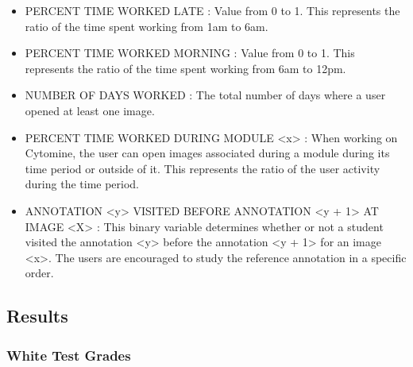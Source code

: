 \documentclass[a4paper,11pt]{report}
\numberwithin{figure}{section} %
\begin{document}
\begin{itemize}
    \item[\textbullet] PERCENT TIME WORKED LATE : Value from 0 to 1.
    This represents the ratio of the time spent working from 1am to 6am.
        
    \item[\textbullet] PERCENT TIME WORKED MORNING : Value from 0 to 1.
    This represents the ratio of the time spent working from 6am to 12pm.
    
    \item[\textbullet] NUMBER OF DAYS WORKED : The total number of days where a user opened at least one image.
    
    \item[\textbullet] PERCENT TIME WORKED DURING MODULE <x> : When working on Cytomine, the user can open images associated during a module during its time period or outside of it.
    This represents the ratio of the user activity during the time period.
    
	\item[\textbullet] ANNOTATION <y> VISITED BEFORE ANNOTATION <y + 1> AT IMAGE <X> : This binary variable determines whether or not a student visited the annotation <y> before the annotation <y + 1> for an image <x>.
	The users are encouraged to study the reference annotation in a specific order.
    
    \end{itemize}
    

    
    \subsection{Results}
    
    \subsubsection{White Test Grades}
    
\end{document}
